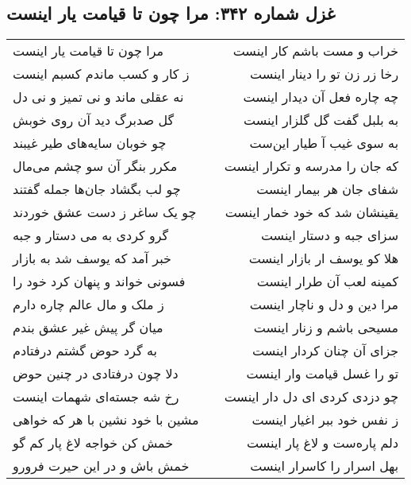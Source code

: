 \begin{center}
\section*{غزل شماره ۳۴۲: مرا چون تا قیامت یار اینست}
\label{sec:0342}
\begin{longtable}{l p{0.5cm} r}
مرا چون تا قیامت یار اینست
&&
خراب و مست باشم کار اینست
\\
ز کار و کسب ماندم کسبم اینست
&&
رخا زر زن تو را دینار اینست
\\
نه عقلی ماند و نی تمیز و نی دل
&&
چه چاره فعل آن دیدار اینست
\\
گل صدبرگ دید آن روی خوبش
&&
به بلبل گفت گل گلزار اینست
\\
چو خوبان سایه‌های طیر غیبند
&&
به سوی غیب آ طیار این‌ست
\\
مکرر بنگر آن سو چشم می‌مال
&&
که جان را مدرسه و تکرار اینست
\\
چو لب بگشاد جان‌ها جمله گفتند
&&
شفای جان هر بیمار اینست
\\
چو یک ساغر ز دست عشق خوردند
&&
یقینشان شد که خود خمار اینست
\\
گرو کردی به می دستار و جبه
&&
سزای جبه و دستار اینست
\\
خبر آمد که یوسف شد به بازار
&&
هلا کو یوسف ار بازار اینست
\\
فسونی خواند و پنهان کرد خود را
&&
کمینه لعب آن طرار اینست
\\
ز ملک و مال عالم چاره دارم
&&
مرا دین و دل و ناچار اینست
\\
میان گر پیش غیر عشق بندم
&&
مسیحی باشم و زنار اینست
\\
به گرد حوض گشتم درفتادم
&&
جزای آن چنان کردار اینست
\\
دلا چون درفتادی در چنین حوض
&&
تو را غسل قیامت وار اینست
\\
رخ شه جسته‌ای شهمات اینست
&&
چو دزدی کردی ای دل دار اینست
\\
مشین با خود نشین با هر که خواهی
&&
ز نفس خود ببر اغیار اینست
\\
خمش کن خواجه لاغ پار کم گو
&&
دلم پاره‌ست و لاغ پار اینست
\\
خمش باش و در این حیرت فرورو
&&
بهل اسرار را کاسرار اینست
\\
\end{longtable}
\end{center}
